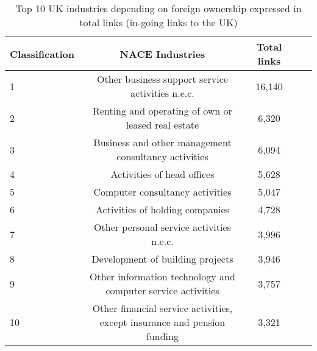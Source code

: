 \begin{table}[!ht]
\begin{adjustwidth}{-2.25in}{0in}
\caption{Top 10 UK industries depending on foreign ownership expressed in total links (in-going links to the UK)\label{tab:uk_ingoinglinks}}
\centering
\medskip
\begin{tabular}{|l|c|c|c|c|}
\hline
Classification  & NACE Industries & Total links \\ 
\hline
1 &      Other business support service activities n.e.c. &   16,140  \\
\hline
2 & Renting and operating of own or leased real estate  &  6,320  \\
\hline
3 & Business and other management consultancy activities &  6,094  \\
\hline
4 &  Activities of head offices &   5,628  \\
\hline
5 &  Computer consultancy activities &   5,047  \\
\hline
6 &  Activities of holding companies &  4,728  \\
\hline
7 &  Other personal service activities n.e.c. &  3,996 \\
\hline
8 &  Development of building projects &  3,946 \\
\hline
9 &  Other information technology and computer service activities &  3,757 \\
\hline
10 &  Other financial service activities, except insurance and pension funding  &  3,321 \\
\hline
\end{tabular}
\end{adjustwidth}
\end{table}



